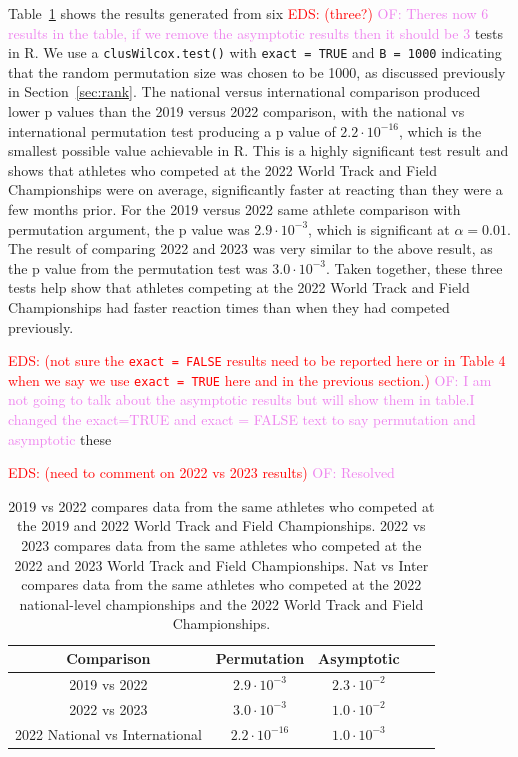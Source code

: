 \documentclass[12pt, letterpaper, titlepage]{article}
\newcommand{\eds}[1]{\textcolor{red}{EDS: (#1)}}
\newcommand{\of}[1]{\textcolor{violet}{OF: #1}}
\begin{document}
Table~\ref{tab:Clusrankresults} shows the results generated from six 
\eds{three?}
\of{Theres now 6 results in the table, if we remove the asymptotic results then
it should be 3}
tests in R.
We use a \texttt{clusWilcox.test()} with \texttt{exact = TRUE} and 
\texttt{B = 1000} indicating that the random permutation size was chosen to be 
1000, as discussed previously in Section~\ref{sec:rank}.  
The national versus international comparison
produced lower p values than the 2019 versus 2022 comparison, with the
national vs international permutation test producing a p value of 
$2.2\cdot10^{-16}$, which is the smallest possible value achievable in R.  This
is a highly significant test result and shows that athletes who competed at the
2022 World Track and Field Championships were on average, significantly faster
at reacting than they were a few months prior.  For the 2019 versus 2022
same athlete comparison with permutation argument, the p value was 
$2.9\cdot10^{-3}$, which is significant at $\alpha = 0.01$.  The result of
comparing 2022 and 2023 was very similar to the above result, as the p value
from the permutation test was $3.0\cdot10^{-3}$.  Taken together, these three
tests help show that athletes competing at the 2022 World Track and Field
Championships had faster reaction times than when they had competed previously.

\eds{not sure the \texttt{exact = FALSE} results need to be reported here or in
Table 4 when we say we use \texttt{exact = TRUE} here and in the previous section.}
\of{I am not going to talk about the asymptotic results but will show them in
table.I changed the exact=TRUE and exact = FALSE text to say permutation and 
asymptotic}
these

\eds{need to comment on 2022 vs 2023 results}
\of{Resolved}

\begin{table}
  \centering
  \caption{2019 vs 2022 compares data from the same athletes who competed at the
  2019 and 2022 World Track and Field Championships. 2022 vs 2023 compares data
  from the same athletes who competed at the 2022 and 2023 World Track and Field
  Championships. Nat vs Inter compares data from the same athletes who competed
  at the 2022 national-level championships and the 2022 World Track and Field
  Championships.}
  \begin{tabular}{c c c c c} 
   \toprule
   Comparison & Permutation & Asymptotic \\ 
   \midrule
   2019 vs 2022 & $2.9\cdot10^{-3}$ & $2.3\cdot10^{-2}$ \\
   2022 vs 2023 & $3.0\cdot10^{-3}$ & $1.0\cdot10^{-2}$ \\
   2022 National vs International & $2.2\cdot10^{-16}$ & $1.0\cdot10^{-3}$ \\
   \bottomrule
  \end{tabular}
  \label{tab:Clusrankresults}
\end{table}
\end{document}
